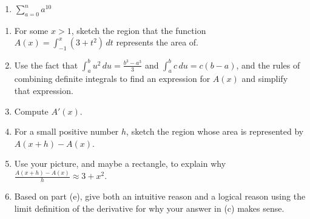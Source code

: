 \begin{enumerate}
\item $\sum_{a = 0}^n a^10$
\end{enumerate}
\begin{enumerate}
\item  For some $x > 1$, sketch the region that the function $\displaystyle{A(x) = \int_{-1}^x (3 + t^2)\,dt}$ represents the area of.
\item  Use the fact that $\displaystyle{\int_a^b u^2\,du = \frac{b^3-a^3}{3}}$ and $\displaystyle{\int_a^bc\,du = c(b-a)}$, and the rules of combining definite integrals to find an expression for $A(x)$ and simplify that expression.
\smallskip
\item  Compute $A'(x)$.
\smallskip
\item  For a small positive number $h$, sketch the region whose area is represented by \\$A(x + h) - A(x)$.
\smallskip
\item  Use your picture, and maybe a rectangle, to explain why $\displaystyle{\frac{A(x+h) - A(x)}{h} \approx 3 + x^2}$.
\smallskip
\item  Based on part (e), give both an intuitive reason and a logical reason using the limit definition of the derivative for why your answer in (c) makes sense.
\smallskip
\end{enumerate}